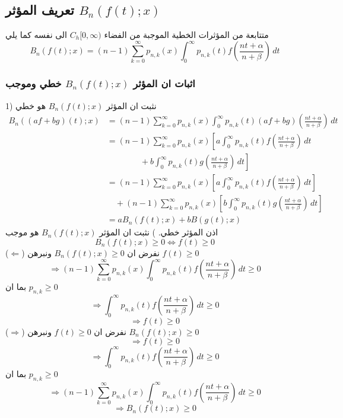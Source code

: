 \chapter{}

\section{تعريف المؤثر $B_n(f(t); x)$}
متتابعة من المؤثرات الخطية الموجبة من الفضاء $C_h[0, \infty)$ الى نفسه كما يلي
\[
B_n(f(t); x) = (n-1)\sum_{k=0}^{\infty} p_{n, k}(x) \int_{0}^{\infty} p_{n, k}(t) f\left(\frac{nt + \alpha}{n + \beta}\right) \, dt
\]

\subsection*{اثبات ان المؤثر $B_n(f(t); x)$ خطي وموجب}
1) نثبت ان المؤثر $B_n(f(t); x)$ هو خطي
\begin{align*}
	B_n((af+bg)(t); x) &= (n-1)\sum_{k=0}^{\infty} p_{n, k}(x) \int_{0}^{\infty} p_{n, k}(t) (af+bg)\left(\frac{nt + \alpha}{n + \beta}\right) \, dt\\
	&= (n-1)\sum_{k=0}^{\infty} p_{n, k}(x)  \left[a\int_{0}^{\infty} p_{n, k}(t) f\left(\frac{nt + \alpha}{n + \beta}\right) \, dt\right.\\
	&\qquad\qquad  +\left. b\int_{0}^{\infty} p_{n, k}(t) g\left(\frac{nt + \alpha}{n + \beta}\right) \, dt\right]\\
	&= (n-1)\sum_{k=0}^{\infty} p_{n, k}(x)  \left[a\int_{0}^{\infty} p_{n, k}(t) f\left(\frac{nt + \alpha}{n + \beta}\right) \, dt\right]\\
	&\quad + (n-1)\sum_{k=0}^{\infty} p_{n, k}(x)  \left[b\int_{0}^{\infty} p_{n, k}(t) g\left(\frac{nt + \alpha}{n + \beta}\right) \, dt\right]\\
	& = a B_n(f(t) ; x) + b B(g(t); x)
\end{align*}
اذن المؤثر خطي.
\newpage
{}) نثبت ان المؤثر $B_n(f(t); x)$ هو موجب
\[
B_n(f(t); x) \geq 0 \iff f(t) \geq 0
\]
($\Leftarrow$) نفرض ان $B_n(f(t); x) \geq 0$ ونبرهن $f(t) \geq 0$
\[
\Rightarrow (n-1)\sum_{k=0}^{\infty} p_{n, k}(x) \int_{0}^{\infty} p_{n, k}(t) f\left(\frac{nt + \alpha}{n + \beta}\right) \, dt \geq 0 
\] 
بما ان $p_{n, k} \geq 0 $ 
\[
\Rightarrow \int_{0}^{\infty} p_{n, k}(t) f\left(\frac{nt + \alpha}{n + \beta}\right) \, dt \geq 0
\]
\[
\Rightarrow f(t) \geq 0
\]
($\Rightarrow$) نفرض ان $f(t) \geq 0$ ونبرهن $B_n(f(t); x) \geq 0$
\[
\Rightarrow f(t) \geq 0
\]
\[
\Rightarrow \int_{0}^{\infty} p_{n, k}(t) f\left(\frac{nt + \alpha}{n + \beta}\right) \, dt \geq 0
\]
بما ان $p_{n, k} \geq 0 $ 
\[
\Rightarrow (n-1)\sum_{k=0}^{\infty} p_{n, k}(x) \int_{0}^{\infty} p_{n, k}(t) f\left(\frac{nt + \alpha}{n + \beta}\right) \, dt \geq 0 
\] 
\[
\Rightarrow B_n(f(t); x) \geq 0
\]

